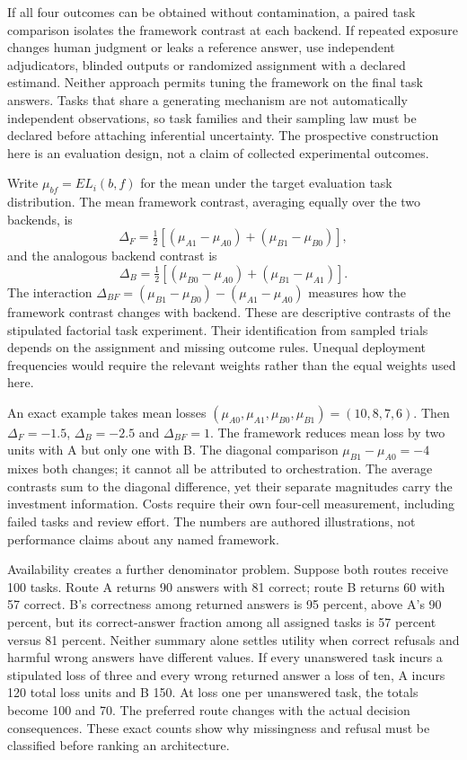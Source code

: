 If all four outcomes can be obtained without contamination, a paired
task comparison isolates the framework contrast at each backend. If
repeated exposure changes human judgment or leaks a reference answer,
use independent adjudicators, blinded outputs or randomized assignment
with a declared estimand. Neither approach permits tuning the framework
on the final task answers. Tasks that share a generating mechanism are
not automatically independent observations, so task families and their
sampling law must be declared before attaching inferential uncertainty.
The prospective construction here is an evaluation design, not a claim
of collected experimental outcomes.
\citep{exec14_l6_adapter_exact}

Write $\mu_{bf}=E{L_i(b,f)}$ for the mean under the target evaluation
task distribution. The mean framework contrast, averaging equally over
the two backends, is
\begin{equation}
 \Delta_F=\tfrac12[(\mu_{A1}-\mu_{A0})+
                              (\mu_{B1}-\mu_{B0})],
\end{equation}
and the analogous backend contrast is
\begin{equation}
 \Delta_B=\tfrac12[(\mu_{B0}-\mu_{A0})+
                              (\mu_{B1}-\mu_{A1})].
\end{equation}
The interaction
$\Delta_{BF}=(\mu_{B1}-\mu_{B0})-(\mu_{A1}-\mu_{A0})$
measures how the framework contrast changes with backend. These are
descriptive contrasts of the stipulated factorial task experiment. Their
identification from sampled trials depends on the assignment and missing
outcome rules. Unequal deployment frequencies would require the relevant
weights rather than the equal weights used here.

An exact example takes mean losses
$(\mu_{A0},\mu_{A1},\mu_{B0},\mu_{B1})=(10,8,7,6)$.
Then $\Delta_F=-1.5$, $\Delta_B=-2.5$ and $\Delta_{BF}=1$.
The framework reduces mean loss by two units with A but only one with B.
The diagonal comparison $\mu_{B1}-\mu_{A0}=-4$ mixes both changes;
it cannot all be attributed to orchestration. The average contrasts
sum to the diagonal difference, yet their separate magnitudes carry the
investment information. Costs require their own four-cell measurement,
including failed tasks and review effort. The numbers are authored
illustrations, not performance claims about any named framework.
\citep{exec14_l6_adapter_exact}

Availability creates a further denominator problem. Suppose both routes
receive 100 tasks. Route A returns 90 answers with 81 correct; route B
returns 60 with 57 correct. B's correctness among returned answers is
95 percent, above A's 90 percent, but its correct-answer fraction among
all assigned tasks is 57 percent versus 81 percent. Neither summary
alone settles utility when correct refusals and harmful wrong answers
have different values. If every unanswered task incurs a stipulated
loss of three and every wrong returned answer a loss of ten, A incurs
120 total loss units and B 150. At loss one per unanswered task, the
totals become 100 and 70. The preferred route changes with the actual
decision consequences. These exact counts show why missingness and
refusal must be classified before ranking an architecture.

